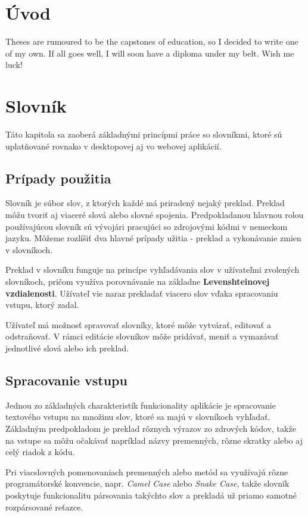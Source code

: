 \documentclass[
  digital, %
  table,   %
  lof,     %
  lot,     %
]{fithesis3}
\begin{document}
\chapter{Úvod}
Theses are rumoured to be the capstones of education, so I decided
to write one of my own. If all goes well, I will soon have a
diploma under my belt. Wish me luck!

\chapter{Slovník}
Táto kapitola sa zaoberá základnými princípmi práce so slovníkmi, ktoré sú uplatňované rovnako v desktopovej aj vo webovej aplikácií.

\section{Prípady použitia}
Slovník je súbor slov, z ktorých každé má priradený nejaký preklad. Preklad môžu tvoriť aj viaceré slová alebo slovné spojenia. Predpokladanou hlavnou rolou používajúcou slovník sú vývojári pracujúci so zdrojovými kódmi v nemeckom jazyku. Môžeme rozlíšiť dva hlavné prípady užitia - preklad a vykonávanie zmien v slovníkoch.

Preklad v slovníku funguje na princípe vyhľadávania slov v užívateľmi zvolených slovníkoch, pričom využíva porovnávanie na základne \textbf{Levenshteinovej vzdialenosti}. Užívateľ vie naraz prekladať viacero slov vďaka spracovaniu vstupu, ktorý zadal.

Užívateľ má možnosť spravovať slovníky, ktoré môže vytvárať, editovať a odstraňovať. V rámci editácie slovníkov môže pridávať, meniť a vymazávať jednotlivé slová alebo ich preklad.

\section{Spracovanie vstupu}
Jednou zo základných charakteristík funkcionality aplikácie je spracovanie textového vstupu na množinu slov, ktoré sa majú v slovníkoch vyhľadať. Základným predpokladom je preklad rôznych výrazov zo zdrových kódov, takže na vstupe sa môžu očakávať napríklad názvy premenných, rôzne skratky alebo aj celý riadok z kódu. 

Pri viacslovných pomenovaniach premenných alebo metód sa využívajú rôzne programátorské konvencie, napr. \textit{Camel Case} alebo \textit{Snake Case}, takže slovník poskytuje funkcionalitu pársovania takýchto slov a prekladá už priamo samotné rozpársované reťazce.
\end{document}
